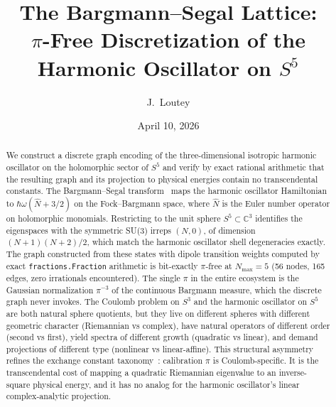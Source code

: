 \documentclass[twocolumn,pra,amsmath,amssymb,superscriptaddress]{revtex4-2}
\begin{document}
\title{The Bargmann--Segal Lattice:\\
$\pi$-Free Discretization of the Harmonic Oscillator on $S^5$}

\author{J.~Loutey}

\date{April 10, 2026}

\begin{abstract}
We construct a discrete graph encoding of the three-dimensional
isotropic harmonic oscillator on the holomorphic sector of $S^5$ and
verify by exact rational arithmetic that the resulting graph and its
projection to physical energies contain no transcendental constants.
The Bargmann--Segal transform~\cite{bargmann1961, hall1994} maps the
harmonic oscillator Hamiltonian to $\hbar\omega(\hat{N} + 3/2)$ on the
Fock--Bargmann space, where $\hat{N}$ is the Euler number operator on
holomorphic monomials. Restricting to the unit sphere $S^5 \subset
\mathbb{C}^3$ identifies the eigenspaces with the symmetric SU(3)
irreps $(N, 0)$, of dimension $(N+1)(N+2)/2$, which match the harmonic
oscillator shell degeneracies exactly.  The graph constructed from
these states with dipole transition weights computed by exact
\texttt{fractions.Fraction} arithmetic is bit-exactly $\pi$-free at
$N_{\max} = 5$ (56 nodes, 165 edges, zero irrationals encountered).
The single $\pi$ in the entire ecosystem is the Gaussian normalization
$\pi^{-3}$ of the continuous Bargmann measure, which the discrete
graph never invokes.  The Coulomb problem on $S^3$ and the harmonic
oscillator on $S^5$ are both natural sphere quotients, but they live
on different spheres with different geometric character (Riemannian vs
complex), have natural operators of different order (second vs first),
yield spectra of different growth (quadratic vs linear), and demand
projections of different type (nonlinear vs linear-affine).  This
structural asymmetry refines the exchange constant
taxonomy~\cite{paper18}: calibration $\pi$ is Coulomb-specific. It is
the transcendental cost of mapping a quadratic Riemannian eigenvalue
to an inverse-square physical energy, and it has no analog for the
harmonic oscillator's linear complex-analytic projection.
\end{abstract}

\maketitle

\end{document}

